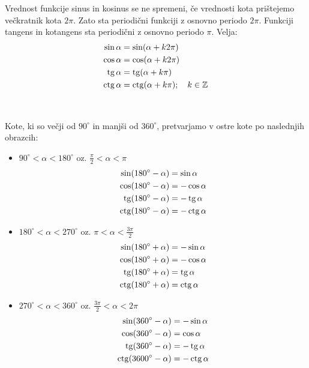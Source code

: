 Vrednost funkcije sinus in kosinus se ne spremeni, če vrednosti kota prištejemo večkratnik kota $2\pi$. Zato sta periodični funkciji z osnovno periodo $2\pi$. Funkciji tangens in kotangens sta periodični z osnovno periodo $\pi$. Velja:
\begin{align*}
\sin\alpha&=\sin(\alpha+k 2\pi) \\
\cos\alpha&= \cos(\alpha +k2\pi) \\
\operatorname{tg}\alpha&= \operatorname{tg}(\alpha +k\pi)\\
\operatorname{ctg}\alpha&= \operatorname{ctg}(\alpha +k\pi); \quad k \in\mathbb{Z}
\end{align*}

\ 

Kote, ki so večji od $90^{\circ}$ in manjši od $360^{\circ}$, pretvarjamo v ostre kote po naslednjih obrazcih:
\begin{itemize}
\item $90^{\circ} <\alpha<180^{\circ}$ oz. $\frac{\pi}{2}<\alpha<\pi$
\begin{align*}
\sin(180^{\circ}-\alpha)&=\sin\alpha \\
\cos(180^{\circ}-\alpha)&=-\cos\alpha \\
\operatorname{tg}(180^{\circ}-\alpha) &=-\operatorname{tg}\alpha \\
\operatorname{ctg}(180^{\circ}-\alpha)&= -\operatorname{ctg}\alpha
\end{align*}

\item $180^{\circ} <\alpha<270^{\circ}$ oz. $\pi<\alpha<\frac{3\pi}{2}$
\begin{align*}
\sin(180^{\circ}+\alpha)&=-\sin\alpha \\
\cos(180^{\circ}+\alpha)&=-\cos\alpha \\
\operatorname{tg}(180^{\circ}+\alpha) &=\operatorname{tg}\alpha \\
\operatorname{ctg}(180^{\circ}+\alpha)&= \operatorname{ctg}\alpha
\end{align*}

\item $270^{\circ} <\alpha<360^{\circ}$ oz. $\frac{3\pi}{2}<\alpha<2\pi$
\begin{align*}
\sin(360^{\circ}-\alpha)&=-\sin\alpha \\
\cos(360^{\circ}-\alpha)&=\cos\alpha \\
\operatorname{tg}(360^{\circ}-\alpha) &=-\operatorname{tg}\alpha \\
\operatorname{ctg}(3600^{\circ}-\alpha)&=-\operatorname{ctg}\alpha
\end{align*}
\end{itemize}

